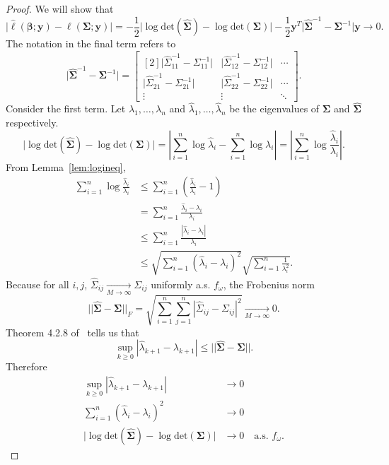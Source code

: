 \begin{proof}

We will show that
\[
\Big|\hat{\ell}(\bm{\beta}; \bm{y}) - \ell(\bm{\Sigma}; \bm{y})\Big| = -\frac{1}{2} \Big| \log \textrm{det}(\widehat{\bm{\Sigma}}) - \log \textrm{det}(\bm{\Sigma}) \Big| - \frac{1}{2} \bm{y}^T \Big| \widehat{\bm{\Sigma}}^{-1} - \bm{\Sigma}^{-1} \Big| \bm{y} \to 0.
\]
The notation in the final term refers to
\[
  \Big| \widehat{\bm{\Sigma}}^{-1} - \bm{\Sigma}^{-1} \Big| =
  \begin{bmatrix}[2]
    \Big| \widehat{\Sigma}^{-1}_{11} - \Sigma^{-1}_{11} \Big| & \Big| \widehat{\Sigma}^{-1}_{12} - \Sigma^{-1}_{12} \Big| & \cdots \\
    \Big| \widehat{\Sigma}^{-1}_{21} - \Sigma^{-1}_{21} \Big| & \Big| \widehat{\Sigma}^{-1}_{22} - \Sigma^{-1}_{22} \Big| & \cdots \\
    \vdots & \vdots & \ddots
  \end{bmatrix}.
\] \label{symb:absmat}
Consider the first term. Let $\lambda_1, \dots, \lambda_n$ and $\hat{\lambda}_1, \dots, \hat{\lambda}_n$ be the eigenvalues of $\bm{\Sigma}$ and $\widehat{\bm{\Sigma}}$ respectively.
\[
  \Big| \log \textrm{det}(\widehat{\bm{\Sigma}}) - \log \textrm{det}(\bm{\Sigma}) \Big| = \left| \sum_{i=1}^n \log \hat{\lambda}_i - \sum_{i=1}^n \log \lambda_i \right| = \left| \sum_{i=1}^n \log \frac{\hat{\lambda}_i}{\lambda_i} \right|.
\]
From Lemma~\ref{lem:logineq},
\begin{align*}
  \sum_{i=1}^n \log \frac{\hat{\lambda}_i}{\lambda_i} &\leq \sum_{i=1}^n \left( \frac{\hat{\lambda}_i}{\lambda_i} - 1 \right) \\
  &= \sum_{i=1}^n \frac{\hat{\lambda}_i - \lambda_i}{\lambda_i} \\
  &\leq \sum_{i=1}^n \frac{|\hat{\lambda}_i - \lambda_i|}{\lambda_i} \\
  &\leq \sqrt{\sum_{i=1}^n (\hat{\lambda}_i - \lambda_i)^2} \sqrt{\sum_{i=1}^n \frac{1}{\lambda_i^2}}. \tag{Cauchy-Schwarz}
\end{align*}
Because for all $i,j$, $\widehat{\Sigma}_{ij} \xrightarrow[M \to \infty]{} \Sigma_{ij}$ uniformly a.s. $f_\omega$, the Frobenius norm 
\[
  ||\widehat{\bm{\Sigma}} - \bm{\Sigma}||_F = \sqrt{\sum_{i=1}^n \sum_{j=1}^n \left| \widehat{\Sigma}_{ij} - \Sigma_{ij} \right|^2} \xrightarrow[M \to \infty]{} 0.
\]
Theorem 4.2.8 of~\cite{hsing2015theoretical} tells us that
\[
  \sup_{k \geq 0} |\hat{\lambda}_{k+1} - \lambda_{k+1}| \leq ||\widehat{\bm{\Sigma}} - \bm{\Sigma}||.
\]
Therefore
\begin{align*}
  \sup_{k \geq 0} |\hat{\lambda}_{k+1} - \lambda_{k+1}| &\to 0 \\
  \sum_{i=1}^n (\hat{\lambda}_i - \lambda_i)^2 &\to 0 \\
  \Big| \log \textrm{det}(\widehat{\bm{\Sigma}}) - \log \textrm{det}(\bm{\Sigma}) \Big| &\to 0 \quad \textrm{a.s. } f_\omega.
\end{align*}


\end{proof}
